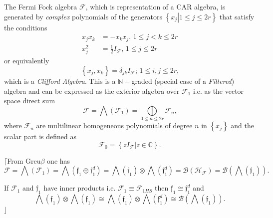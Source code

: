 \documentclass[aps, preprint]{revtex4}
\begin{document}
The Fermi Fock algebra $\mathcal{F}\text{,}$ which is representation of a CAR algebra, is generated by \emph{complex} polynomials of the generators $\left \{\left .x_{j}\right \vert 1 \leq j \leq 2 r\right \}$ that satisfy the conditions
\begin{align}x_{j} x_{k} &  = -x_{k} x_{j} ,\,1 \leq j <k \leq 2 r \\
x_{j}^{2} &  =\frac{1}{2} I_{\mathcal{F}} ,\,1 \leq j \leq 2 r\end{align}or equivalently
\begin{equation}\left \{x_{j} ,x_{k}\right \} =\delta _{j k} I_{\mathcal{F}} ;\,1 \leq i ,j \leq 2 r\text{,}
\end{equation}which is a \emph{Clifford Algebra}. This is a $\mathbb{N} -$graded (special case of a \emph{Filtered}) algebra and can be expressed as the exterior algebra over $\mathcal{F}_{1}$ i.e. as the vector space direct sum
\begin{equation}\mathcal{F} =\bigwedge \left (\mathcal{F}_{1}\right ) =\underset{0 \leq n \leq 2 r}{\bigoplus }\mathcal{F}_{n}\text{,}
\end{equation}where $\mathcal{F}_{n}$ are multilinear homogeneous polynomials of degree $n$ in $\left \{x_{j}\right \}$ and the scalar part is defined as
\begin{equation}\mathcal{F}_{0} =\left \{\left .z I_{\mathcal{F}}\right \vert z \in \mathbb{C}\right \}\text{.}
\end{equation}

$\lceil $From Greu$\beta $ one has
\begin{equation}\mathcal{F} =\bigwedge \left (\mathcal{F}_{1}\right ) =\bigwedge \left (\mathfrak{f}_{1} \oplus \mathfrak{f}_{1}^{d}\right ) =\bigwedge \left (\mathfrak{f}_{1}\right ) \otimes \bigwedge  \left (\mathfrak{f}_{1}^{d}\right ) =\mathcal{B} \left (\mathcal{H}_{\mathcal{F}}\right ) =\mathcal{B} \left (\bigwedge \left (\mathfrak{f}_{1}\right )\right )\text{.}
\end{equation}

If $\mathcal{F}_{1}$ and $\mathfrak{f}_{1}$ have inner products i.e. $\mathcal{F}_{1} \equiv \mathcal{F}_{1 H S}$ then $\mathfrak{f}_{1} \cong \mathfrak{f}_{1}^{d}$ and
\begin{equation}\bigwedge \left (\mathfrak{f}_{1}\right ) \otimes \bigwedge  \left (\mathfrak{f}_{1}\right ) \cong \bigwedge \left (\mathfrak{f}_{1}\right ) \otimes \bigwedge  \left (\mathfrak{f}_{1}^{d}\right ) \cong \mathcal{B} \left (\bigwedge \left (\mathfrak{f}_{1}\right )\right )\text{.}
\end{equation}$\rfloor $ 
\end{document}

